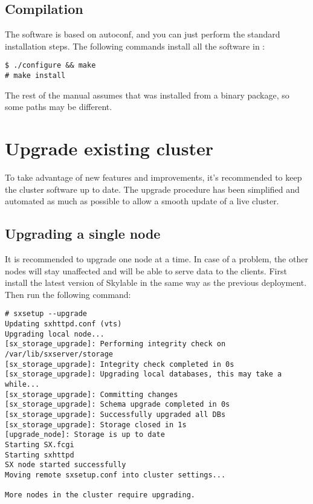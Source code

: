 \subsection{Compilation}
The software is based on autoconf, and you can just perform the standard
installation steps. The following commands install all the software in
:
\begin{lstlisting}
$ ./configure && make
# make install
\end{lstlisting}
The rest of the manual assumes that \SX was installed from a binary
package, so some paths may be different.

\section{Upgrade existing cluster}
To take advantage of new features and improvements, it's recommended to
keep the cluster software up to date. The upgrade procedure has been
simplified and automated as much as possible to allow a smooth update
of a live cluster.
\subsection{Upgrading a single node}
It is recommended to upgrade one node at a time. In case of a problem, the
other nodes will stay unaffected and will be able to serve data to the
clients.
First install the latest version of Skylable \SX in the same way as the
previous deployment. Then run the following command:
\begin{lstlisting}
# sxsetup --upgrade
Updating sxhttpd.conf (vts)
Upgrading local node...
[sx_storage_upgrade]: Performing integrity check on /var/lib/sxserver/storage
[sx_storage_upgrade]: Integrity check completed in 0s
[sx_storage_upgrade]: Upgrading local databases, this may take a while...
[sx_storage_upgrade]: Committing changes
[sx_storage_upgrade]: Schema upgrade completed in 0s
[sx_storage_upgrade]: Successfully upgraded all DBs
[sx_storage_upgrade]: Storage closed in 1s
[upgrade_node]: Storage is up to date
Starting SX.fcgi
Starting sxhttpd
SX node started successfully
Moving remote sxsetup.conf into cluster settings...

More nodes in the cluster require upgrading.
\end{lstlisting}

